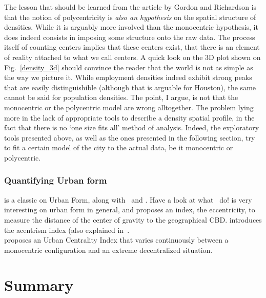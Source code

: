 The lesson that should be learned from the article by Gordon and Richardson is
that the notion of polycentricity is \emph{also an hypothesis} on the spatial
structure of densities. While it is arguably more involved than the monocentric
hypothesis, it does indeed consists in imposing some structure onto the raw
data. The process itself of counting centers implies that these centers exist,
that there is an element of reality attached to what we call centers. A quick
look on the 3D plot shown on Fig.~\ref{density_3d} should convince the reader
that the world is not as simple as the way we picture it. While employment
densities indeed exhibit strong peaks that are easily distinguishible (although
that is arguable for Houston), the same cannot be said for population densities.
The point, I argue, is not that the monocentric or the polycentric model are
wrong alltogether. The problem lying more in the lack of appropriate tools to
describe a density spatial profile, in the fact that there is no `one size fits
all' method of analysis. Indeed, the exploratory tools presented above, as well
as the ones presented in the following section, try to fit a certain model of
the city to the actual data, be it monocentric or polycentric.\\

\subsubsection{Quantifying Urban form}
\label{sub:urban_form}

\cite{Tsai:2005} is a classic on Urban Form, along with~\cite{LeNechet:2015} and
\cite{Schwarz:2010}.
Have a look at what~\cite{Berroir:2008} do!
\cite{Bertaud:2001} is very interesting on urban form in general, and proposes
an index, the eccentricity, to measure the distance of the center of gravity to
the geographical CBD.
\cite{LeNechet:2010} introduces the acentrism index (also explained
in~\cite{LeNechet:2015}.\\
\cite{Pereira:2013} proposes an Urban Centrality Index that varies continuously
between a monocentric configuration and an extreme decentralized situation.

\section{Summary}
\label{sec:summary}

